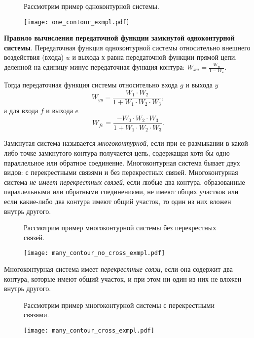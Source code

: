 \documentclass[../../TAU.tex]{subfiles}
\begin{document}
    \begin{figure}[h]
        \begin{minipage}[h]{0.29\linewidth}
            Рассмотрим пример одноконтурной системы.
            \vspace{3cm}
        \end{minipage}
        \begin{minipage}[h]{0.70\linewidth}
            \texttt{[image: one\_contour\_exmpl.pdf]}
        \end{minipage}
    \end{figure}
    {\bf Правило вычисления передаточной функции замкнутой одноконтурной системы}. 
    Передаточная функция одноконтурной системы относительно внешнего воздействия (входа) $u$ и выхода $х$ равна передаточной функции прямой цепи, деленной на единицу минус передаточная функция контура: $W_{xu}=\frac{W_\text{п}}{1-W_\text{к}}$.

    Тогда передаточная функция системы относительно входа $g$ и выхода $y$ 
    $$W_{gy}=\frac{W_1\cdot W_2}{1+W_1\cdot W_2\cdot W_3},$$
    а для входа $f$ и выхода $e$ 
    $$W_{fe}=\frac{-W_0\cdot W_2\cdot W_3}{1+W_1\cdot W_2\cdot W_3}.$$

     Замкнутая система называется {\it многоконтурной}, если при ее размыкании в какой-либо точке замкнутого контура получается цепь, содержащая хотя бы одно параллельное или обратное соединение. Многоконтурная система бывает двух видов: с перекрестными связями и без перекрестных связей.
    Многоконтурная система {\it не имеет перекрестных связей}, если любые два контура, образованные параллельными или обратными соединениями, не имеют общих участков или если какие-либо два контура имеют общий участок, то один из них вложен внутрь другого.
    \begin{figure}[h]
        \begin{minipage}[h]{0.19\linewidth}
            Рассмотрим пример многоконтурной системы без перекрестных связей.
            \vspace{3cm}
        \end{minipage}
        \begin{minipage}[h]{0.80\linewidth}
            \texttt{[image: many\_contour\_no\_cross\_exmpl.pdf]}
        \end{minipage}
    \end{figure}
    Многоконтурная система имеет {\it перекрестные связи}, если она содержит два контура, которые имеют общий участок, и при этом ни один из них не вложен внутрь другого.
    \begin{figure}[h]
        \begin{minipage}[h]{0.19\linewidth}
            Рассмотрим пример многоконтурной системы с перекрестными связями.
            \vspace{2cm}
        \end{minipage}
        \begin{minipage}[h]{0.80\linewidth}
            \texttt{[image: many\_contour\_cross\_exmpl.pdf]}
        \end{minipage}
    \end{figure}
    \FloatBarrier
    \clearpage
\end{document}
